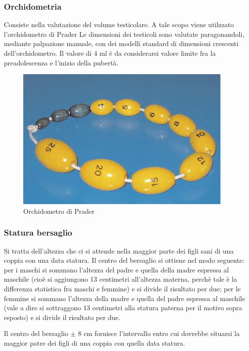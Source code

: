 \subsubsection*{Orchidometria}
Consiste nella valutazione del volume testicolare. A tale scopo viene utilzzato l'orchidometro di Prader %
Le dimensioni dei testicoli sono valutate paragonandoli, mediante palpazione manuale, con dei modelli standard di dimensioni crescenti dell'orchidometro. Il valore di 4 ml è da considerarsi valore limite fra la preadolescenza e l'inizio della pubertà.  

\begin{figure}[h]
  \begin{center}
	\includegraphics[scale=0.60]{grafici/orchidometro.jpg}
  \end{center}
  \caption{Orchidometro di Prader}
\end{figure}

\subsubsection*{Statura bersaglio}
Si tratta dell'altezza che ci si attende nella maggior parte dei figli sani di una coppia con una data statura. Il centro del bersaglio si ottiene nel modo seguente: per i maschi si sommano l'altezza del padre e quella della madre espressa al maschile (cioè si aggiungono 13 centimetri all'altezza materna, perchè tale è la differenza statistica fra maschi e femmine) e si divide il risultato per due; per le femmine si sommano l'altezza della madre e quella del padre espressa al maschile (vale a dire si sottraggono 13 centimetri alla statura paterna per il motivo sopra esposto) e si divide il risultato per due. 

Il centro del bersaglio $\pm$ 8 cm fornisce l'intervallo entro cui dovrebbe situarsi la maggior patre dei figli di una coppia con quella data statura.





